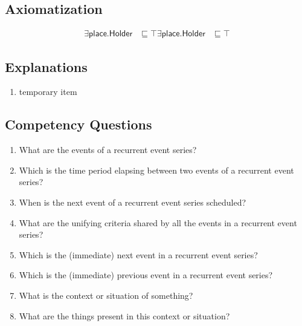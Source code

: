 \subsection{Axiomatization}
\label{axs:recurrent-event}
\begin{align}
\exists\textsf{place.Holder} &\sqsubseteq \top 
\exists\textsf{place.Holder} &\sqsubseteq \top 
\end{align}

\subsection{Explanations}
\label{exp:recurrent-event}
\begin{enumerate}
\item temporary item
\end{enumerate}

\subsection{Competency Questions}
\label{cqs:recurrent-event}
\begin{enumerate}[CQ1.]
    \item What are the events of a recurrent event series?
    \item Which is the time period elapsing between two events of a recurrent event series?
    \item When is the next event of a recurrent event series scheduled?
    \item What are the unifying criteria shared by all the events in a recurrent event series?
    \item Which is the (immediate) next event in a recurrent event series?
    \item Which is the (immediate) previous event in a recurrent event series?
    \item What is the context or situation of something? 
    \item What are the things present in this context or situation?
\end{enumerate}

\newpage
